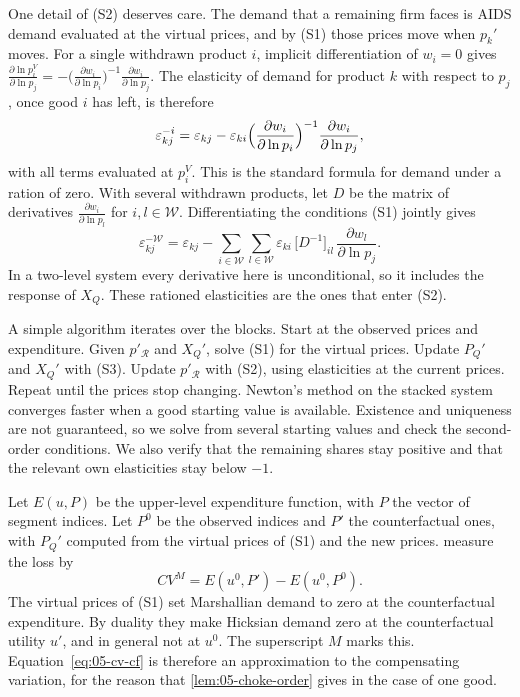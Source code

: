 One detail of (S2) deserves care. The demand that a remaining firm faces is AIDS demand evaluated at the
virtual prices, and by (S1) those prices move when $p_k'$ moves. For a single withdrawn product $i$, implicit
differentiation of $w_i = 0$ gives
$\frac{\partial\ln p_i^V}{\partial\ln p_j} = -\bigl(\frac{\partial w_i}{\partial\ln p_i}\bigr)^{-1}\frac{\partial w_i}{\partial\ln p_j}$.
The elasticity of demand for product $k$ with respect to $p_j$, once good $i$ has left, is therefore
\begin{equation}\label{eq:05-rationed-elast}
  \varepsilon_{kj}^{-i} = \varepsilon_{kj} - \varepsilon_{ki}\Bigl(\frac{\partial w_i}{\partial\ln p_i}\Bigr)^{-1}\frac{\partial w_i}{\partial\ln p_j},
\end{equation}
with all terms evaluated at $p_i^V$. This is the standard formula for demand under a ration of zero. With several
withdrawn products, let $D$ be the matrix of derivatives $\frac{\partial w_i}{\partial\ln p_l}$ for $i, l \in
\mathcal{W}$. Differentiating the conditions (S1) jointly gives
\begin{equation}\label{eq:05-rationed-elast-multi}
  \varepsilon_{kj}^{-\mathcal{W}} = \varepsilon_{kj} - \sum_{i\in\mathcal{W}}\sum_{l\in\mathcal{W}}
  \varepsilon_{ki}\,\bigl[D^{-1}\bigr]_{il}\,\frac{\partial w_l}{\partial\ln p_j} .
\end{equation}
In a two-level system every derivative here is unconditional, so it includes the response of $X_Q$. These rationed
elasticities are the ones that enter (S2).

A simple algorithm iterates over the blocks. Start at the observed prices and expenditure. Given $p'_{\mathcal{R}}$
and $X_Q'$, solve (S1) for the virtual prices. Update $P_Q'$ and $X_Q'$ with (S3). Update $p'_{\mathcal{R}}$ with
(S2), using elasticities at the current prices. Repeat until the prices stop changing. Newton's method on the
stacked system converges faster when a good starting value is available. Existence and uniqueness are not
guaranteed, so we solve from several starting values and check the second-order conditions. We also verify
that the remaining shares stay positive and that the relevant own elasticities stay below $-1$.

Let $E(u,P)$ be the upper-level expenditure function, with $P$ the vector of segment indices. Let $P^0$ be the
observed indices and $P'$ the counterfactual ones, with $P_Q'$ computed from the virtual prices of (S1) and the
new prices. \citet[eq.~3.16]{ChaudhuriGoldbergJia2006} measure the loss by
\begin{equation}\label{eq:05-cv-cf}
  CV^M = E(u^0,P') - E(u^0,P^0).
\end{equation}
The virtual prices of (S1) set Marshallian demand to zero at the counterfactual expenditure. By duality they
make Hicksian demand zero at the counterfactual utility $u'$, and in general not at $u^0$. The superscript $M$
marks this. Equation~\eqref{eq:05-cv-cf} is therefore an approximation to the compensating variation, for the
reason that \cref{lem:05-choke-order} gives in the case of one good.

